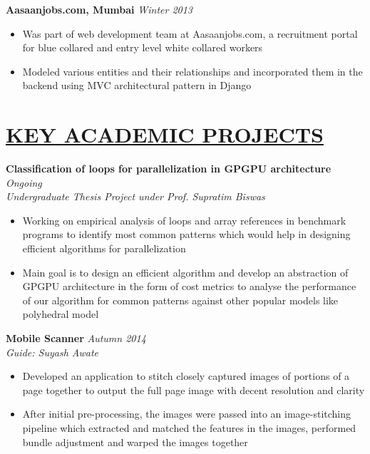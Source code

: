 \documentclass[11pt]{res}
\begin{document}
\begin{resume}
\vspace{-10pt}
\textbf{Aasaanjobs.com, Mumbai} \hfill \emph{Winter 2013}
 \begin{itemize} \itemsep -2pt
\item Was part of web development team at Aasaanjobs.com, a recruitment portal for blue collared and entry level white collared workers
\item Modeled various entities and their relationships and incorporated them in the backend using MVC architectural pattern in Django

\end{itemize} \vspace{-6pt}

\section{\underline{KEY ACADEMIC PROJECTS}} 
\vspace{3pt}

\textbf{Classification of loops for parallelization in GPGPU architecture} \hfill \emph{Ongoing}\\
\textsl{Undergraduate Thesis Project under Prof. Supratim Biswas}\hfill
\begin{itemize} \itemsep -2pt
\item Working on empirical analysis of loops and array references in benchmark programs to identify most common patterns which would help in designing efficient algorithms for parallelization
\item Main goal is to design an efficient algorithm and develop an abstraction of GPGPU architecture in the form of cost metrics to analyse the performance of our algorithm for common patterns against other popular models like polyhedral model
\end{itemize}

\vspace{-10pt}
\textbf{Mobile Scanner} \hfill \emph{Autumn 2014}\\
\textsl{Guide: Suyash Awate}\hfill
\begin{itemize} \itemsep -2pt
\item Developed an application to stitch closely captured images of portions of a page together to output the full page image with decent resolution and clarity
\item After initial pre-processing, the images were passed into an image-stitching pipeline which extracted and matched the features in the images, performed bundle adjustment and warped the images together 
\end{itemize}


\end{resume}
\end{document}
